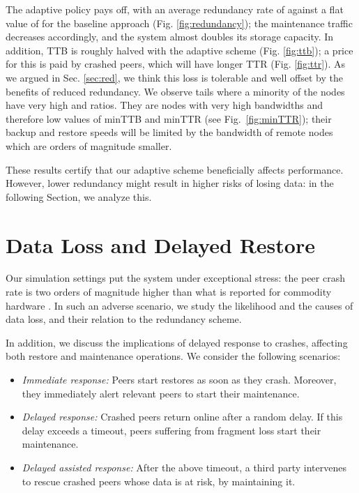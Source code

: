 \documentclass[conference,10pt]{IEEEtran}
\begin{document}
The adaptive policy pays off, with an average redundancy rate of
 against a flat value of  for the baseline approach
(Fig. \ref{fig:redundancy}); the maintenance traffic decreases
accordingly, and the system almost doubles its storage capacity. In
addition, TTB is roughly halved with the adaptive scheme
(Fig. \ref{fig:ttb}); a price for this is paid by crashed peers, which
will have longer TTR (Fig. \ref{fig:ttr}). As we argued in
Sec. \ref{sec:red}, we think this loss is tolerable and well offset by
the benefits of reduced redundancy. We observe
tails where a minority of the nodes have very high  and
 ratios. They are nodes with very high bandwidths and
therefore low values of minTTB and minTTR (see Fig.~\ref{fig:minTTR});
their backup and restore speeds will be limited by the bandwidth of
remote nodes which are orders of magnitude smaller.


These results certify that our adaptive scheme beneficially affects performance. However, lower redundancy might result in higher risks of losing data: in the following Section, we analyze this.

\section{Data Loss and Delayed Restore}
\label{sec:repair}

Our simulation settings put the system under exceptional stress: the peer crash rate is two orders of magnitude higher than what is reported for commodity hardware \cite{fast07}. In such an adverse scenario, we study the likelihood and the causes of data loss, and their relation to the redundancy scheme. 

In addition, we discuss the implications of delayed response to crashes, affecting both restore and maintenance operations. We consider the following scenarios:

\begin{itemize}
\item \emph{Immediate response:} Peers start restores as soon as they crash. Moreover, they immediately alert relevant peers to start their maintenance.
\item \emph{Delayed response:} Crashed peers return online after a
      random delay. If this delay exceeds a timeout, peers suffering from fragment loss start their maintenance.
\item \emph{Delayed assisted response:} After the above timeout, a third party intervenes to rescue crashed peers whose data is at risk, by maintaining it.
\end{itemize}
\end{document}
